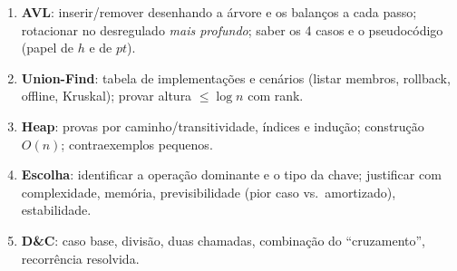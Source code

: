 \begin{chave}
\begin{enumerate}
  \item \textbf{AVL}: inserir/remover desenhando a árvore e os balanços a cada passo; rotacionar no desregulado \emph{mais profundo}; saber os 4 casos e o pseudocódigo (papel de $h$ e de $pt$).
  \item \textbf{Union-Find}: tabela de implementações e cenários (listar membros, rollback, offline, Kruskal); provar altura $\le\log n$ com rank.
  \item \textbf{Heap}: provas por caminho/transitividade, índices e indução; construção $O(n)$; contraexemplos pequenos.
  \item \textbf{Escolha}: identificar a operação dominante e o tipo da chave; justificar com complexidade, memória, previsibilidade (pior caso vs.\ amortizado), estabilidade.
  \item \textbf{D\&C}: caso base, divisão, duas chamadas, combinação do ``cruzamento'', recorrência resolvida.
\end{enumerate}
\end{chave}
